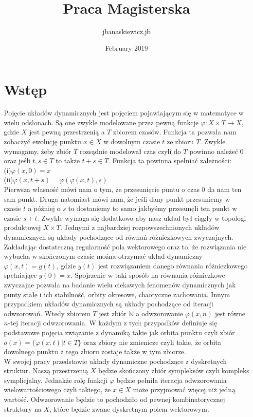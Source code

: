 \documentclass[12pt,a4paper]{article}
\title{Praca Magisterska}
\author{jbanaskiewicz.jb }
\date{February 2019}
\newcommand{\fun}[3]{#1:#2 \rightarrow #3}
\begin{document}
\maketitle

\section{Wstęp}
Pojęcie układów dynamicznych jest pojęciem pojawiającym się w matematyce w wielu odsłonach. Są one zwykle modelowane przez pewną funkcje $\fun{\varphi }{X\times T}{X}$, gdzie $X$ jest pewną przestrzenią a $T$ zbiorem czasów. Funkcja ta pozwala nam zobaczyć ewolucję punktu $x\in X$ w dowolnym czasie $t$ ze zbioru $T$. Zwykle wymagamy, żeby zbiór $T$ rozsądnie modelował czas czyli do $T$ powinno należeć $0$ oraz jeśli $t,s\in T $
to także $t+s\in T$. Funkcja ta powinna spełniać zależności:
\\(i)$\varphi(x,0) = x$
\\(ii)$\varphi(x,t+s) =\varphi(\varphi(x,t),s)$
\noindent
\\
Pierwsza własność mówi nam o tym, że przesunięcie puntu o czas $0$ da nam ten sam punkt. Druga natomiast mówi nam, że jeśli dany punkt przesuniemy w czasie $t$ a później o $s$ to dostaniemy to samo jakbyśmy przesunęli ten punkt w czasie $s+t$. Zwykle wymaga się dodatkowo aby nasz układ był ciągły w topologi produktowej $X\times T$. 
Jednymi z najbardziej rozpowszechnionych układów dynamicznych są układy pochodzące od równań różniczkowych zwyczajnych. Zakładając dostateczną regularność pola wektorowego oraz to, że rozwiązania nie wybucha w skończonym czasie można otrzymać układ dynamiczny $\varphi(x,t) = y(t)$, gdzie $y(t)$ jest rozwiązaniem danego równania różniczkowego spełniające $y(0)=x$. Spojrzenie w taki sposób na równania różniczkowe zwyczajne pozwala na badanie wielu ciekawych fenomenów dynamicznych jak punty stałe i ich stabilność, orbity okresowe, chaotyczne zachowania. Innym przypadkiem układów dynamicznych są układy pochodzące od iteracji odwzorowań. Wtedy zbiorem $T$ jest zbiór $\mathbb{N}$ a odwzorowanie $\varphi(x,n)$ jest równe $n$-tej iteracji odwzorowania. W każdym z tych przypadków definiuje się podstawowe pojęcia związanie z dynamiką takie jak orbita punktu czyli zbiór $o(x)=\{\varphi(x,t)|t\in T\}$ oraz zbiory nie zmienicze czyli takie, że orbita dowolnego punktu z tego zbioru zostaje także w tym zbiorze.
\\
W swojej pracy przedstawie układy dynamiczne pochodzące z dyskretnych struktur. Naszą przestrzenią $X$ będzie skończony zbiór sympleksów czyli kompleks symplicjalny. Jednakże rolę funkcji $\varphi$ będzie pełniła iteracja odwzorowania wielowartościowego czyli takiego, że $x\in X$ może przyjmować więcej niż jedną wartość. Odwzorowanie będzie to pochodziło od pewnej kombinatorycznej struktury na $X$, które będzie zwane dyskretnym polem wektorowym.
\end{document}
